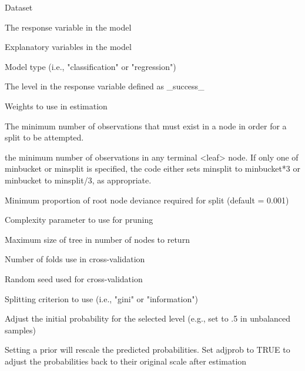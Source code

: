 \documentclass[a4paper]{book}
\begin{document}
\begin{Arguments}
\begin{ldescription}
\item[\code{dataset}] Dataset

\item[\code{rvar}] The response variable in the model

\item[\code{evar}] Explanatory variables in the model

\item[\code{type}] Model type (i.e., "classification" or "regression")

\item[\code{lev}] The level in the response variable defined as \_success\_

\item[\code{wts}] Weights to use in estimation

\item[\code{minsplit}] The minimum number of observations that must exist in a node in order for a split to be attempted.

\item[\code{minbucket}] the minimum number of observations in any terminal <leaf> node. If only one of minbucket or minsplit is specified, the code either sets minsplit to minbucket*3 or minbucket to minsplit/3, as appropriate.

\item[\code{cp}] Minimum proportion of root node deviance required for split (default = 0.001)

\item[\code{pcp}] Complexity parameter to use for pruning

\item[\code{nodes}] Maximum size of tree in number of nodes to return

\item[\code{K}] Number of folds use in cross-validation

\item[\code{seed}] Random seed used for cross-validation

\item[\code{split}] Splitting criterion to use (i.e., "gini" or "information")

\item[\code{prior}] Adjust the initial probability for the selected level (e.g., set to .5 in unbalanced samples)

\item[\code{adjprob}] Setting a prior will rescale the predicted probabilities. Set adjprob to TRUE to adjust the probabilities back to their original scale after estimation


\end{ldescription}
\end{Arguments}
\end{document}
